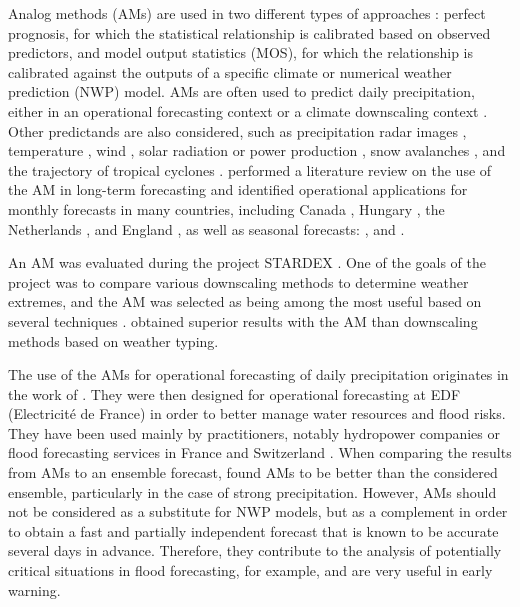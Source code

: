 \documentclass[review]{elsarticle}
\begin{document}
Analog methods (AMs) are used in two different types of approaches \citep{Rummukainen1997}: perfect prognosis, for which the statistical relationship is calibrated based on observed predictors, and model output statistics (MOS), for which the relationship is calibrated against the outputs of a specific climate or numerical weather prediction (NWP) model. AMs are often used to predict daily precipitation, either in an operational forecasting context \citep[e.g.][]{Guilbaud1997, Bontron2005, Hamill2006, Bliefernicht2010, Marty2012, Horton2012, Hamill2015, BenDaoud2016} or a climate downscaling context \citep[e.g.][]{Zorita1999, Wetterhall2005, Wetterhall2007, Matulla2007, Radanovics2013, Chardon2014, Dayon2015, Raynaud2016b}. Other predictands are also considered, such as precipitation radar images \citep{Panziera2011,Foresti2015a}, temperature \citep{Radinovic1975, Woodcock1980, Kruizinga1983, DelleMonache2013, Caillouet2016, Raynaud2016b}, wind \citep{Gordon1987, DelleMonache2013, DelleMonache2011, Vanvyve2015, Alessandrini2015, Junk2015, Junk2015c}, solar radiation or power production \citep{Alessandrini2015a, Bessa2015, Raynaud2016b}, snow avalanches \citep{Obled1980, Bolognesi1993}, and the trajectory of tropical cyclones \citep{Keenan1981, Sievers2000, Fraedrich2003}. \citet{Guilbaud1997} performed a literature review on the use of the AM in long-term forecasting and identified operational applications for monthly forecasts in many countries, including Canada \citep{Shabbar1986},  Hungary \citep{Toth1989}, the Netherlands \citep{Nap1981}, and England \citep{Murray1974}, as well as seasonal forecasts: \citet{Barnett1978}, \citet{Bergen1982} and \citet{Livezey1988}.

An AM was evaluated during the project STARDEX \citep[\textit{STAtistical and Regional dynamical Downscaling of EXtremes for European regions}, see][]{Goodess2003, Stardex2005}. One of the goals of the project was to compare various downscaling methods to determine weather extremes, and the AM was selected as being among the most useful based on several techniques \citep{Maheras2005, Schmidli2007}. \citet{Bliefernicht2010} obtained superior results with the AM than downscaling methods based on weather typing.

The use of the AMs for operational forecasting of daily precipitation originates in the work of \citet{Duband1970, Duband1974, Duband1981}. They were then designed for operational forecasting at EDF (Electricit\'{e} de France) in order to better manage water resources and flood risks. They have been used mainly by practitioners, notably hydropower companies \citep{Desaint2008a, BenDaoud2009, Obled2014} or flood forecasting services in France and Switzerland \citep{Marty2010, GarciaHernandez2009b, Horton2012}. When comparing the results from AMs to an ensemble forecast, \citet{Marty2010} found AMs to be better than the considered ensemble, particularly in the case of strong precipitation. However, AMs should not be considered as a substitute for NWP models, but as a complement in order to obtain a fast and partially independent forecast that is known to be accurate several days in advance. Therefore, they contribute to the analysis of potentially critical situations in flood forecasting, for example, and are very useful in early warning.
\end{document}
